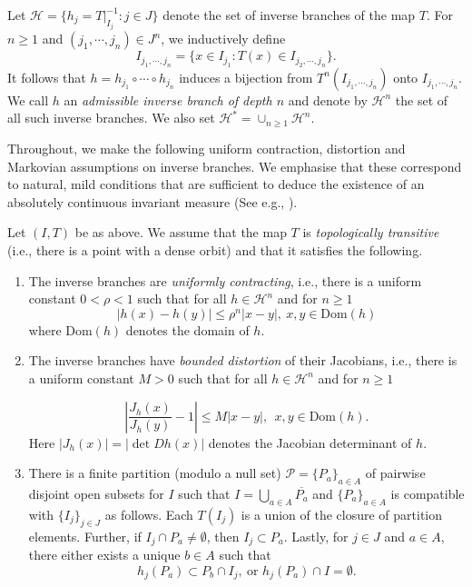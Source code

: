 \documentclass[12pt,a4paper,reqno]{amsart}
\begin{document}
Let $\mathcal{H}=\{ h_j=T|_{I_j}^{-1}: j \in J \}$ denote the set of inverse branches  of the map $T$. For $n \geq 1$ and $(j_1, \cdots, j_n) \in J^n$, we inductively define
\[ I_{j_1, \cdots, j_n}=\{ x \in I_{j_1}: T(x) \in I_{j_2, \cdots, j_n} \} . \]
It follows that $h=h_{j_1} \circ \cdots \circ h_{j_n}$ induces a bijection  from $T^n (I_{j_1, \cdots, j_n}) $ onto $ I_{j_1, \cdots, j_n}$. We call $h$ an \emph{admissible inverse branch of depth $n$} and denote by $\mathcal{H}^n$ the set of all such inverse branches. We also set $\mathcal{H}^\ast = \cup_{n\ge 1} \mathcal{H}^n$.

Throughout, we make the following uniform contraction, distortion and Markovian assumptions on inverse branches. We emphasise that these correspond to natural, mild conditions that are sufficient to deduce the existence of an absolutely continuous invariant measure (See e.g., \cite{mayer}).

\begin{assumption}  \label{assmp:exp}
Let $(I,T)$ be as above. We assume that the map $T$ is \emph{topologically transitive} (i.e., there is a point with a dense orbit)
and that it satisfies the following.
 \begin{enumerate}
\item The inverse branches  are \emph{uniformly contracting}, i.e., there is a uniform constant $0<\rho<1$ such that   for all  $ h \in  \mathcal{H}^n $ and for $n \geq 1$
\[  |h(x)-h(y)| \leq \rho^n |x-y|,  \ x,y \in \mathrm{Dom}(h) \]
where $ \mathrm{Dom}(h)$ denotes the domain of $h$.

\item The  inverse branches have \emph{bounded distortion} of their Jacobians, i.e., there is a uniform constant $M >0$ such that    for all  $ h \in  \mathcal{H}^n $ and for $n \geq 1$

\[ \left| \frac{J_h(x)}{J_h(y)}-1\right| \leq M |x-y| , \ \ x,y \in \mathrm{Dom}(h) . \]
Here $|J_h(x)|=|\det Dh(x) |$ denotes the Jacobian determinant of $h$. %

\item There is a finite partition (modulo a null set) $\mathcal{P}=\{P_a\}_{a \in A}$ of pairwise disjoint open subsets for $I$ such that $I=\bigcup_{a \in A} \overline{P_a}$ and $\{P_a\}_{a \in A}$ is compatible with $\{I_j\}_{j \in J}$ as follows. Each $T(I_j)$ is a  union of the closure of partition elements. Further, if $I_j \cap P_a \neq \emptyset$, then $I_j \subset P_a$. %
Lastly, for $j \in J$ and $a \in A$, there either exists a unique $b \in A$ such that 
\[ h_j(P_a) \subset P_b \cap I_j, \ \mbox{or } h_j(P_a) \cap I = \emptyset . \]
\end{enumerate}
\end{assumption}
\end{document}
